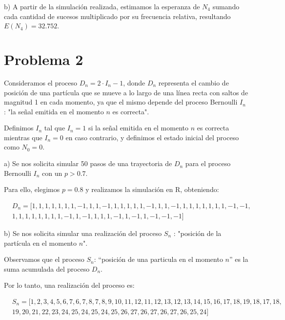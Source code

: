 \documentclass[11pt]{article}
\begin{document}
\vspace{-2cm}

b) A partir de la simulación realizada, estimamos la esperanza de $N_4$ sumando cada cantidad de sucesos multiplicado por su frecuencia relativa, resultando $E(N_4)=32.752$. 

\section*{Problema 2}

Consideramos el proceso $D_n =2\cdot I_n-1$, donde $D_n$ representa el cambio de posición de una partícula que se mueve a
lo largo de una línea recta con saltos de magnitud 1 en cada momento, ya que el mismo depende del
proceso Bernoulli $I_n$ : "la señal emitida en el momento $n$ es correcta".

Definimos $I_n$ tal que $I_n = 1$ si la señal emitida en el momento $n$ es correcta mientras que $I_n = 0$ en caso contrario, y definimos el estado inicial del proceso como $N_0 = 0$.

a) Se nos solicita simular 50 pasos de una trayectoria de $D_n$ para el proceso Bernoulli $I_n$ con un $p > 0.7$.

Para ello, elegimos $p=0.8$ y realizamos la simulación en R, obteniendo: 

\begin{align*}
    &D_n = [1, 1, 1, 1, 1, 1, 1, -1, 1, 1, -1, 1, 1, 1, 1, 1, -1, 1, 1, -1, 1, 1, 1, 1, 1, 1, 1, -1, -1, \\
    &1, 1, 1, 1, 1, 1, 1, 1, -1, 1, -1, 1, 1, 1, -1, 1, -1, 1, -1, -1, -1]
\end{align*}

b) Se nos solicita simular una realización del proceso $S_n$ : "posición de la partícula en el momento $n$".

Observamos que el proceso $S_n$: “posición de una particula en el momento $n$” es la suma
acumulada del proceso $D_n$.

Por lo tanto, una realización del proceso es: 

\vspace{-1.25cm}

\begin{align*}
    &S_n = [1, 2, 3, 4, 5, 6, 7, 6, 7, 8, 7, 8, 9, 10, 11, 12, 11, 12, 13, 12, 13, 14, 15, 16, 17, 18, 19, 18, 17, 18, \\
    &19, 20, 21, 22, 23, 24, 25, 24, 25, 24, 25, 26, 27, 26, 27, 26, 27, 26, 25, 24]
\end{align*}
\end{document}
